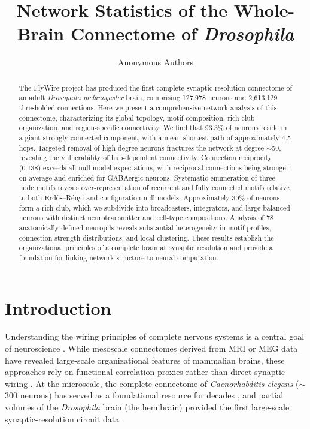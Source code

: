 \documentclass[11pt]{article}
\title{Network Statistics of the Whole-Brain Connectome of \textit{Drosophila}}
\author{Anonymous Authors}
\date{}
\begin{document}
\maketitle

\begin{abstract}
The FlyWire project has produced the first complete synaptic-resolution connectome of an adult \textit{Drosophila melanogaster} brain, comprising 127,978 neurons and 2,613,129 thresholded connections. Here we present a comprehensive network analysis of this connectome, characterizing its global topology, motif composition, rich club organization, and region-specific connectivity. We find that 93.3\% of neurons reside in a giant strongly connected component, with a mean shortest path of approximately 4.5 hops. Targeted removal of high-degree neurons fractures the network at degree $\sim$50, revealing the vulnerability of hub-dependent connectivity. Connection reciprocity (0.138) exceeds all null model expectations, with reciprocal connections being stronger on average and enriched for GABAergic neurons. Systematic enumeration of three-node motifs reveals over-representation of recurrent and fully connected motifs relative to both Erd\H{o}s--R\'{e}nyi and configuration null models. Approximately 30\% of neurons form a rich club, which we subdivide into broadcasters, integrators, and large balanced neurons with distinct neurotransmitter and cell-type compositions. Analysis of 78 anatomically defined neuropils reveals substantial heterogeneity in motif profiles, connection strength distributions, and local clustering. These results establish the organizational principles of a complete brain at synaptic resolution and provide a foundation for linking network structure to neural computation.
\end{abstract}

\section{Introduction}

Understanding the wiring principles of complete nervous systems is a central goal of neuroscience \citep{sporns2005human}. While mesoscale connectomes derived from MRI or MEG data have revealed large-scale organizational features of mammalian brains, these approaches rely on functional correlation proxies rather than direct synaptic wiring \citep{vandenHeuvel2011rich}. At the microscale, the complete connectome of \textit{Caenorhabditis elegans} ($\sim$300 neurons) has served as a foundational resource for decades \citep{white1986structure}, and partial volumes of the \textit{Drosophila} brain (the hemibrain) provided the first large-scale synaptic-resolution circuit data \citep{scheffer2020connectome}.
\end{document}
